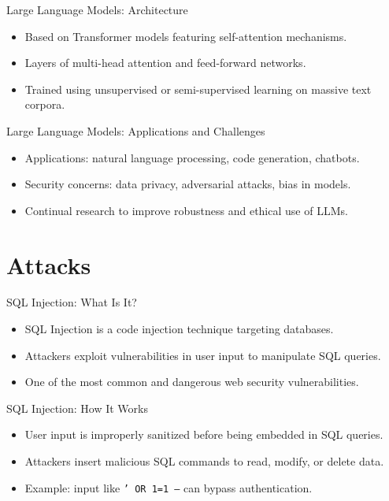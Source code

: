 \documentclass[t,ignorenonframetext]{beamer}
\begin{document}
\begin{frame}{Large Language Models: Architecture}
\begin{itemize}
\item Based on Transformer models featuring self-attention mechanisms.
\item Layers of multi-head attention and feed-forward networks.
\item Trained using unsupervised or semi-supervised learning on massive text corpora.
\end{itemize}
\end{frame}

\begin{frame}{Large Language Models: Applications and Challenges}
\begin{itemize}
\item Applications: natural language processing, code generation, chatbots.
\item Security concerns: data privacy, adversarial attacks, bias in models.
\item Continual research to improve robustness and ethical use of LLMs.
\end{itemize}
\end{frame}

\section{Attacks}
\begin{frame}{SQL Injection: What Is It?}
\begin{itemize}
\item SQL Injection is a code injection technique targeting databases.
\item Attackers exploit vulnerabilities in user input to manipulate SQL queries.
\item One of the most common and dangerous web security vulnerabilities.
\end{itemize}
\end{frame}

\begin{frame}{SQL Injection: How It Works}
\begin{itemize}
\item User input is improperly sanitized before being embedded in SQL queries.
\item Attackers insert malicious SQL commands to read, modify, or delete data.
\item Example: input like \texttt{' OR 1=1 --} can bypass authentication.
\end{itemize}
\end{frame}
\end{document}
